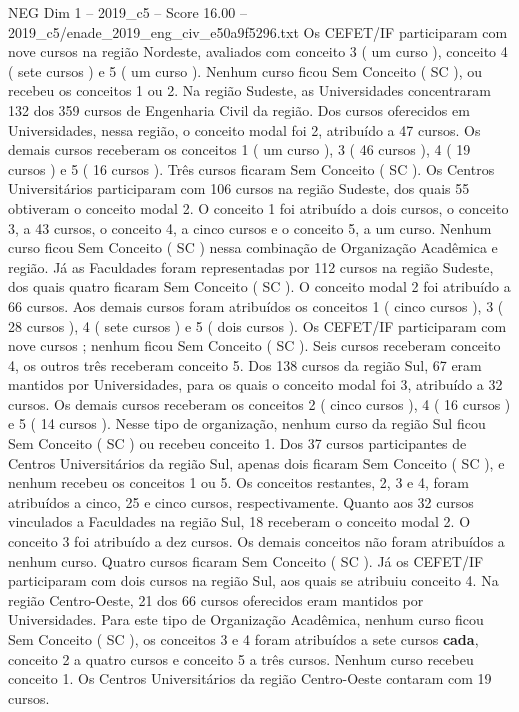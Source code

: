 \begin{textsample}{NEG Dim 1 – 2019\_c5 – Score 16.00 – 2019\_c5/enade\_2019\_eng\_civ\_e50a9f5296.txt}
Os CEFET/IF participaram com nove cursos na região Nordeste, avaliados com conceito 3 ( um curso ), conceito 4 ( sete cursos ) e 5 ( um curso ).
Nenhum curso ficou Sem Conceito ( SC ), ou recebeu os conceitos 1 ou 2.
Na região Sudeste, as Universidades concentraram 132 dos 359 cursos de Engenharia Civil da região.
Dos cursos oferecidos em Universidades, nessa região, o conceito modal foi 2, atribuído a 47 cursos.
Os demais cursos receberam os conceitos 1 ( um curso ), 3 ( 46 cursos ), 4 ( 19 cursos ) e 5 ( 16 cursos ).
Três cursos ficaram Sem Conceito ( SC ).
Os Centros Universitários participaram com 106 cursos na região Sudeste, dos quais 55 obtiveram o conceito modal 2.
O conceito 1 foi atribuído a dois cursos, o conceito 3, a 43 cursos, o conceito 4, a cinco cursos e o conceito 5, a um curso.
Nenhum curso ficou Sem Conceito ( SC ) nessa combinação de Organização Acadêmica e região.
Já as Faculdades foram representadas por 112 cursos na região Sudeste, dos quais quatro ficaram Sem Conceito ( SC ).
O conceito modal 2 foi atribuído a 66 cursos.
Aos demais cursos foram atribuídos os conceitos 1 ( cinco cursos ), 3 ( 28 cursos ), 4 ( sete cursos ) e 5 ( dois cursos ).
Os CEFET/IF participaram com nove cursos ; nenhum ficou Sem Conceito ( SC ).
Seis cursos receberam conceito 4, os outros três receberam conceito 5.
Dos 138 cursos da região Sul, 67 eram mantidos por Universidades, para os quais o conceito modal foi 3, atribuído a 32 cursos.
Os demais cursos receberam os conceitos 2 ( cinco cursos ), 4 ( 16 cursos ) e 5 ( 14 cursos ).
Nesse tipo de organização, nenhum curso da região Sul ficou Sem Conceito ( SC ) ou recebeu conceito 1.
Dos 37 cursos participantes de Centros Universitários da região Sul, apenas dois ficaram Sem Conceito ( SC ), e nenhum recebeu os conceitos 1 ou 5.
Os conceitos restantes, 2, 3 e 4, foram atribuídos a cinco, 25 e cinco cursos, respectivamente.
Quanto aos 32 cursos vinculados a Faculdades na região Sul, 18 receberam o conceito modal 2.
O conceito 3 foi atribuído a dez cursos.
Os demais conceitos não foram atribuídos a nenhum curso.
Quatro cursos ficaram Sem Conceito ( SC ).
Já os CEFET/IF participaram com dois cursos na região Sul, aos quais se atribuiu conceito 4.
Na região Centro-Oeste, 21 dos 66 cursos oferecidos eram mantidos por Universidades.
Para este tipo de Organização Acadêmica, nenhum curso ficou Sem Conceito ( SC ), os conceitos 3 e 4 foram atribuídos a sete cursos \textbf{cada}, conceito 2 a quatro cursos e conceito 5 a três cursos.
Nenhum curso recebeu conceito 1.
Os Centros Universitários da região Centro-Oeste contaram com 19 cursos.

\end{textsample}
